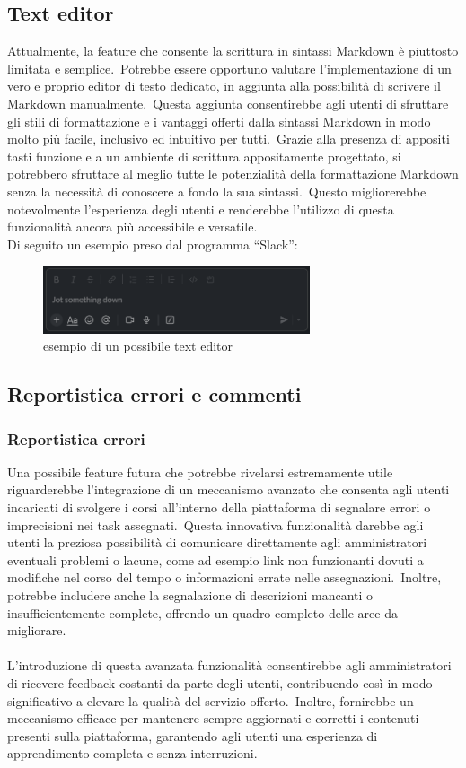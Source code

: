 \subsection{Text editor}\label{sec:cap_sec_subsec}
Attualmente, la feature che consente la scrittura in sintassi Markdown è piuttosto limitata e semplice.\
Potrebbe essere opportuno valutare l'implementazione di un vero e proprio editor di testo dedicato, 
in aggiunta alla possibilità di scrivere il Markdown manualmente.\ Questa aggiunta consentirebbe agli 
utenti di sfruttare gli stili di formattazione e i vantaggi offerti dalla sintassi Markdown in modo molto più facile, 
inclusivo ed intuitivo per tutti.\ Grazie alla presenza di appositi tasti funzione e a un ambiente di scrittura 
appositamente progettato, si potrebbero sfruttare al meglio tutte le potenzialità della formattazione Markdown 
senza la necessità di conoscere a fondo la sua sintassi.\ Questo migliorerebbe notevolmente l'esperienza degli 
utenti e renderebbe l'utilizzo di questa funzionalità ancora più accessibile e versatile.
\\
Di seguito un esempio preso dal programma ``Slack'':
\begin{figure}[ht]
	\centering
	\includegraphics[width=0.7\textwidth]{img/textEditor.png}
	\caption{esempio di un possibile text editor}
	\label{fig:textEditor}
\end{figure}
%
%
\subsection{Reportistica errori e commenti}\label{sec:cap_sec_subsec}
\subsubsection{Reportistica errori}
Una possibile feature futura che potrebbe rivelarsi estremamente utile riguarderebbe 
l'integrazione di un meccanismo avanzato che consenta agli utenti incaricati di svolgere 
i corsi all'interno della piattaforma di segnalare errori o imprecisioni nei task assegnati.\ 
Questa innovativa funzionalità darebbe agli utenti la preziosa possibilità di comunicare direttamente 
agli amministratori eventuali problemi o lacune, come ad esempio link non funzionanti dovuti a modifiche 
nel corso del tempo o informazioni errate nelle assegnazioni.\ Inoltre, potrebbe includere anche la segnalazione 
di descrizioni mancanti o insufficientemente complete, offrendo un quadro completo delle aree da migliorare.
\\ \\
L'introduzione di questa avanzata funzionalità consentirebbe agli amministratori di ricevere feedback costanti 
da parte degli utenti, contribuendo così in modo significativo a elevare la qualità del servizio offerto.\ 
Inoltre, fornirebbe un meccanismo efficace per mantenere sempre aggiornati e corretti i contenuti presenti 
sulla piattaforma, garantendo agli utenti una esperienza di apprendimento completa e senza interruzioni.
